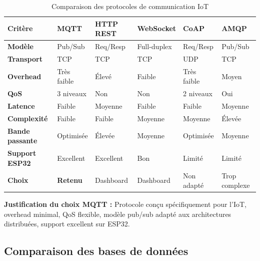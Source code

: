 \begin{table}[htbp]
\centering
\small
\caption{Comparaison des protocoles de communication IoT}
\label{tab:protocol_comparison}
\begin{tabular}{|p{2.5cm}|p{2cm}|p{2cm}|p{2cm}|p{2cm}|p{2cm}|}
\hline
\rowcolor{sewesblu!20}
\textbf{Critère} & \textbf{MQTT} & \textbf{HTTP REST} & \textbf{WebSocket} & \textbf{CoAP} & \textbf{AMQP} \\
\hline
\textbf{Modèle} & Pub/Sub & Req/Resp & Full-duplex & Req/Resp & Pub/Sub \\
\hline
\textbf{Transport} & TCP & TCP & TCP & UDP & TCP \\
\hline
\textbf{Overhead} & Très faible & Élevé & Faible & Très faible & Moyen \\
\hline
\textbf{QoS} & 3 niveaux & Non & Non & 2 niveaux & Oui \\
\hline
\textbf{Latence} & Faible & Moyenne & Faible & Faible & Moyenne \\
\hline
\textbf{Complexité} & Faible & Faible & Moyenne & Moyenne & Élevée \\
\hline
\textbf{Bande passante} & Optimisée & Élevée & Moyenne & Optimisée & Moyenne \\
\hline
\textbf{Support ESP32} & Excellent & Excellent & Bon & Limité & Limité \\
\hline
\rowcolor{green!10}
\textbf{Choix} & \textbf{Retenu} & Dashboard & Dashboard & Non adapté & Trop complexe \\
\hline
\end{tabular}
\end{table}

\textbf{Justification du choix MQTT :} Protocole conçu spécifiquement pour l'IoT, overhead minimal, QoS flexible, modèle pub/sub adapté aux architectures distribuées, support excellent sur ESP32.

\subsection{Comparaison des bases de données}


